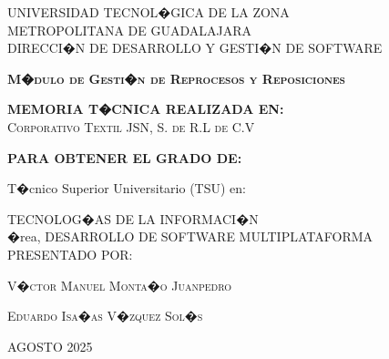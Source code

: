 \documentclass[12pt,letterpaper,spanish, xcolor=table]{report}
\begin{document}
\thispagestyle{empty}


\begin{center}

 \begin{minipage}[b]{.9\linewidth}
    \begin{center}
        \vspace{0.2in}
        \large{UNIVERSIDAD TECNOL�GICA DE LA ZONA \\METROPOLITANA DE GUADALAJARA}\\
        \large{DIRECCI�N DE DESARROLLO Y GESTI�N DE SOFTWARE}\\
    \end{center}
\end{minipage}
\vspace{0.3in}


\centerline{\hbox{}}

\LARGE{\textbf{\textsc{M�dulo de Gesti�n de Reprocesos y Reposiciones}} }

\vspace{0.2in}
\large{\textbf{MEMORIA T�CNICA REALIZADA EN:}}
 \\  \textsc{Corporativo Textil JSN, S. de R.L de C.V}

\vspace{0.2in}
\large{\textbf{PARA OBTENER EL GRADO DE:}}

\large{T�cnico Superior Universitario (TSU) en:}


\large{TECNOLOG�AS DE LA INFORMACI�N\\�rea, DESARROLLO DE SOFTWARE MULTIPLATAFORMA }
\\

\vspace{0.2in}
\large{PRESENTADO POR:}


\textsc{V�ctor Manuel Monta�o Juanpedro}  %


\textsc{Eduardo Isa�as V�zquez Sol�s}  %

\vspace{0.2in}
\small{ AGOSTO 2025}
\end{center}


\newpage



\end{document}
